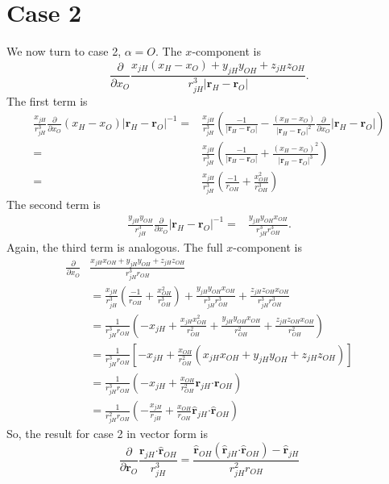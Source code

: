 \documentclass{article}
\newcommand{\vect}[1]{\boldsymbol{\mathbf{#1}}}
\begin{document}
\section{Case 2}
We now turn to case 2, $\alpha=O$.
The $x$-component is
\begin{equation}
\frac{\partial}{\partial x_O} \frac{x_{jH}(x_H-x_O)+y_{jH}y_{OH} + z_{jH}z_{OH}}{r_{jH}^3|\vect r_H-\vect r_O|}. 
\end{equation}
The first term is
\begin{align*}
\frac{x_{jH}}{r_{jH}^3}\frac{\partial}{\partial x_O} (x_H-x_O)|\vect r_H-\vect r_O|^{-1} =& \frac{x_{jH}}{r_{jH}^3}\left( \frac{-1}{|\vect r_H-\vect r_O|} - \frac{(x_H-x_O)}{|\vect r_H-\vect r_O|^2}\frac{\partial}{\partial x_O} |\vect r_H-\vect r_O| \right) \\
=& \frac{x_{jH}}{r_{jH}^3}\left( \frac{-1}{|\vect r_H-\vect r_O|} + \frac{(x_H-x_O)^2}{|\vect r_H-\vect r_O|^3} \right) \\
=& \frac{x_{jH}}{r_{jH}^3}\left( \frac{-1}{r_{OH}} + \frac{x_{OH}^2}{r_{OH}^3} \right)
\end{align*}
The second term is
\begin{align}
\frac{y_{jH}y_{OH}}{r_{jH}^3}\frac{\partial}{\partial x_O} |\vect r_H-\vect r_O|^{-1} =& \frac{y_{jH}y_{OH}x_{OH}}{r_{jH}^3r_{OH}^3}.
\end{align}
Again, the third term is analogous.
The full $x$-component is
\begin{align*}
\frac{\partial}{\partial x_O} &\frac{x_{jH}x_{OH}+y_{jH}y_{OH} + z_{jH}z_{OH}}{r_{jH}^3r_{OH}} \\
&= \frac{x_{jH}}{r_{jH}^3}\left( \frac{-1}{r_{OH}} + \frac{x_{OH}^2}{r_{OH}^3} \right) + \frac{y_{jH}y_{OH}x_{OH}}{r_{jH}^3r_{OH}^3} + \frac{z_{jH}z_{OH}x_{OH}}{r_{jH}^3r_{OH}^3} \\
&= \frac{1}{r_{jH}^3r_{OH}}\left( -x_{jH} + \frac{x_{jH}x_{OH}^2}{r_{OH}^2} + \frac{y_{jH}y_{OH}x_{OH}}{r_{OH}^2} + \frac{z_{jH}z_{OH}x_{OH}}{r_{OH}^2} \right) \\
&= \frac{1}{r_{jH}^3r_{OH}}\left[ -x_{jH} + \frac{x_{OH}}{r_{OH}^2} \left( x_{jH}x_{OH} + y_{jH}y_{OH} + z_{jH}z_{OH} \right) \right] \\
&= \frac{1}{r_{jH}^3r_{OH}}\left( -x_{jH} + \frac{x_{OH}}{r_{OH}^2} \vect r_{jH}\vect\cdot\vect r_{OH} \right) \\
&= \frac{1}{r_{jH}^2r_{OH}}\left( -\frac{x_{jH}}{r_{jH}} + \frac{x_{OH}}{r_{OH}} \vect{ \hat r}_{jH}\vect\cdot\vect{\hat r}_{OH} \right)
\end{align*}
So, the result for case 2 in vector form is
\begin{equation}
\frac{\partial}{\partial \vect r_O} \frac{\vect{r}_{jH}\vect\cdot\vect{\hat r}_{OH} }{r_{jH}^3} = \frac{ \vect{\hat r}_{OH}(\vect{\hat r}_{jH}\vect\cdot\vect{\hat r}_{OH}) - \vect{\hat r}_{jH}}{r_{jH}^2r_{OH}}
\end{equation}
\end{document}
